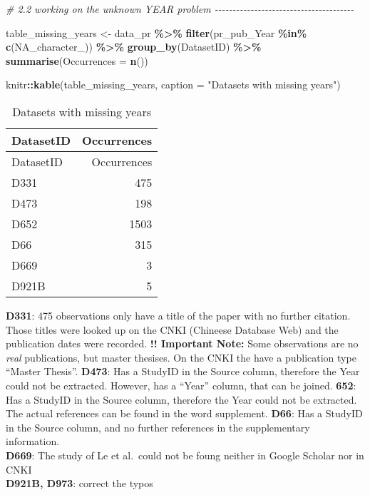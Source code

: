 \documentclass[
]{article}
\newenvironment{Shaded}{\begin{snugshade}}{\end{snugshade}}
\newcommand{\AttributeTok}[1]{\textcolor[rgb]{0.13,0.29,0.53}{#1}}
\newcommand{\CommentTok}[1]{\textcolor[rgb]{0.56,0.35,0.01}{\textit{#1}}}
\newcommand{\ConstantTok}[1]{\textcolor[rgb]{0.56,0.35,0.01}{#1}}
\newcommand{\FunctionTok}[1]{\textcolor[rgb]{0.13,0.29,0.53}{\textbf{#1}}}
\newcommand{\NormalTok}[1]{#1}
\newcommand{\OtherTok}[1]{\textcolor[rgb]{0.56,0.35,0.01}{#1}}
\newcommand{\SpecialCharTok}[1]{\textcolor[rgb]{0.81,0.36,0.00}{\textbf{#1}}}
\newcommand{\StringTok}[1]{\textcolor[rgb]{0.31,0.60,0.02}{#1}}
\begin{document}
\begin{Shaded}
\begin{Highlighting}[]
\CommentTok{\# 2.2 working on the unknown YEAR problem {-}{-}{-}{-}{-}{-}{-}{-}{-}{-}{-}{-}{-}{-}{-}{-}{-}{-}{-}{-}{-}{-}{-}{-}{-}{-}{-}{-}{-}{-}{-}{-}{-}{-}{-}{-}{-}{-}{-}}

\NormalTok{table\_missing\_years }\OtherTok{\textless{}{-}} 
\NormalTok{data\_pr }\SpecialCharTok{\%\textgreater{}\%} 
  \FunctionTok{filter}\NormalTok{(pr\_pub\_Year }\SpecialCharTok{\%in\%} \FunctionTok{c}\NormalTok{(}\ConstantTok{NA\_character\_}\NormalTok{)) }\SpecialCharTok{\%\textgreater{}\%} 
  \FunctionTok{group\_by}\NormalTok{(DatasetID) }\SpecialCharTok{\%\textgreater{}\%} 
  \FunctionTok{summarise}\NormalTok{(}\AttributeTok{Occurrences =} \FunctionTok{n}\NormalTok{())}

\NormalTok{knitr}\SpecialCharTok{::}\FunctionTok{kable}\NormalTok{(table\_missing\_years, }\AttributeTok{caption =} \StringTok{"Datasets with missing years"}\NormalTok{)}
\end{Highlighting}
\end{Shaded}

\begin{longtable}[]{@{}lr@{}}
\caption{Datasets with missing years}\tabularnewline
\toprule\noalign{}
DatasetID & Occurrences \\
\midrule\noalign{}
\endfirsthead
\toprule\noalign{}
DatasetID & Occurrences \\
\midrule\noalign{}
\endhead
\bottomrule\noalign{}
\endlastfoot
D331 & 475 \\
D473 & 198 \\
D652 & 1503 \\
D66 & 315 \\
D669 & 3 \\
D921B & 5 \\
\end{longtable}

\textbf{D331}: 475 observations only have a title of the paper with no
further citation. Those titles were looked up on the CNKI (Chineese
Database Web) and the publication dates were recorded. \textbf{!!
Important Note:} Some observations are no \emph{real} publications, but
master thesises. On the CNKI the have a publication type ``Master
Thesis''. \textbf{D473}: Has a StudyID in the Source column, therefore
the Year could not be extracted. However, has a ``Year'' column, that
can be joined. \textbf{652}: Has a StudyID in the Source column,
therefore the Year could not be extracted. The actual references can be
found in the word supplement. \textbf{D66}: Has a StudyID in the Source
column, and no further references in the supplementary information.\\
\textbf{D669}: The study of Le et al.~could not be foung neither in
Google Scholar nor in CNKI\\
\textbf{D921B, D973}: correct the typos
\end{document}
